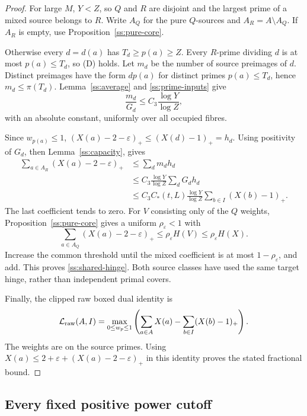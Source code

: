 \begin{proof}
For large $M$, $Y<Z$, so $Q$ and $R$ are disjoint and the largest prime
of a mixed source belongs to $R$. Write $A_Q$ for the pure $Q$-sources
and $A_R=A\setminus A_Q$. If $A_R$ is empty, use
Proposition~\ref{ss:pure-core}.

Otherwise every $d=d(a)$ has $T_d\ge p(a)\ge Z$.
Every $R$-prime dividing $d$ is at most $p(a)\le T_d$, so (D) holds.
Let $m_d$ be the number of source preimages of $d$. Distinct preimages
have the form $dp(a)$ for distinct primes $p(a)\le T_d$, hence
$m_d\le\pi(T_d)$. Lemma~\ref{ss:average} and
\eqref{ss:prime-inputs} give
\begin{equation}
 \frac{m_d}{G_d}
 \le C_3\frac{\log Y}{\log Z},
 \label{ss:fibre-ratio}
\end{equation}
with an absolute constant, uniformly over all occupied fibres.

Since $w_{p(a)}\le1$,
$(X(a)-2-\varepsilon)_+\le(X(d)-1)_+=h_d$.
Using positivity of $G_d$, then Lemma~\ref{ss:capacity}, gives
\[
 \begin{split}
 \sum_{a\in A_R}(X(a)-2-\varepsilon)_+
 &\le\sum_d m_dh_d\\
 &\le C_3\frac{\log Y}{\log Z}\sum_dG_dh_d\\
 &\le C_3C_*(t,L)\frac{\log Y}{\log Z}
                  \sum_{b\in I}(X(b)-1)_+.
 \end{split}
\]
The last coefficient tends to zero.
For $V$ consisting only of the $Q$ weights,
Proposition~\ref{ss:pure-core} gives a uniform $\rho_\varepsilon<1$ with
\[
 \sum_{a\in A_Q}(X(a)-2-\varepsilon)_+
 \le\rho_\varepsilon H(V)\le\rho_\varepsilon H(X).
 \]
Increase the common threshold until the mixed coefficient is at most
$1-\rho_\varepsilon$, and add. This proves \eqref{ss:shared-hinge}.
Both source classes have used the same target hinge, rather than
independent primal covers.

Finally, the clipped raw boxed dual identity \cite{Synthesis} is
\[
 \mathcal L_{\rm raw}(A,I)=
 \max_{0\le w_p\le1}
 \left(\sum_{a\in A}X(a)-\sum_{b\in I}(X(b)-1)_+\right).
 \]
The weights are on the source primes. Using
$X(a)\le2+\varepsilon+(X(a)-2-\varepsilon)_+$ in this identity
proves the stated fractional bound.
\end{proof}

\subsection{Every fixed positive power cutoff}


